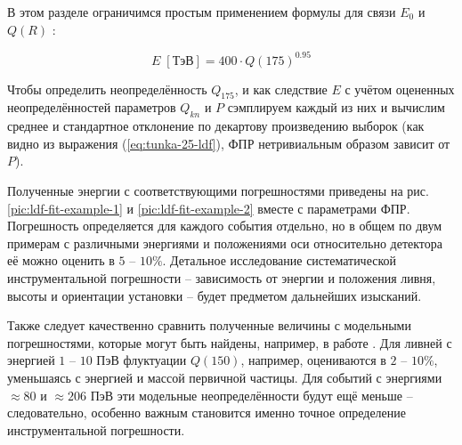 В этом разделе ограничимся простым применением формулы для связи $E_0$ и $Q(R)$ \cite{Budnev2005}:

\begin{equation}
	\label{eq:E0-from-Q175}
	E \; [\text{ТэВ}] = 400 \cdot Q(175)^{0.95}
\end{equation}

Чтобы определить неопределённость $Q_{175}$, и как следствие $E$ с учётом оцененных неопределённостей параметров $Q_{kn}$ и $P$ сэмплируем каждый из них и вычислим среднее и стандартное отклонение по декартову произведению выборок (как видно из выражения (\ref{eq:tunka-25-ldf}), ФПР нетривиальным образом зависит от $P$).

Полученные энергии с соответствующими погрешностями приведены на рис. \ref{pic:ldf-fit-example-1} и \ref{pic:ldf-fit-example-2} вместе с параметрами ФПР. Погрешность определяется для каждого события отдельно, но в общем по двум примерам с различными энергиями и положениями оси относительно детектора её можно оценить в $5$ -- $10 \%$. Детальное исследование систематической инструментальной погрешности -- зависимость от энергии и положения ливня, высоты и ориентации установки -- будет предметом дальнейших изысканий.

Также следует качественно сравнить полученные величины с модельными погрешностями, которые могут быть найдены, например, в работе \cite[табл. 1]{Anokhina2007}. Для ливней с энергией $1$ -- $10$ ПэВ флуктуации $Q(150)$, например, оцениваются в $2$ -- $10 \%$, уменьшаясь с энергией и массой первичной частицы. Для событий с энергиями $\approx 80$ и $\approx 206$ ПэВ эти модельные неопределённости будут ещё меньше -- следовательно, особенно важным становится именно точное определение инструментальной погрешности.

